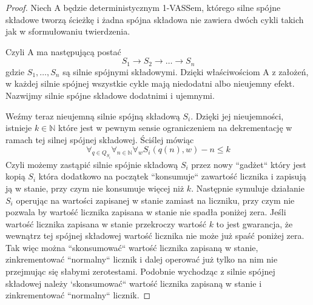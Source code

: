     \begin{proof}
        Niech A będzie deterministycznym 1-VASSem, którego silne spójne składowe tworzą ścieżkę i żadna spójna składowa
        nie zawiera dwóch cykli takich jak w sformułowaniu twierdzenia.

        Czyli A ma następującą postać
        \[S_1 \rightarrow S_2 \rightarrow \dots \rightarrow S_n     \]
        gdzie $S_1, \dots , S_n$ są silnie spójnymi składowymi.
        Dzięki właściwościom A z założeń, w każdej silnie spójnej wszystkie cykle mają niedodatni albo nieujemny efekt.
        Nazwijmy silnie spójne składowe dodatnimi i ujemnymi.

        Weźmy teraz nieujemną silnie spójną składową $S_i$.
        Dzięki jej nieujemności, istnieje $k \in \mathbb{N}$ które jest w pewnym sensie ograniczeniem na dekrementację w ramach tej silnej spójnej składowej.
        Ściślej mówiąc
        \[\forall_{q \in Q_{S_i}} \forall_{n \in \mathbb{N}} \forall_w S_i(q(n),w) -n \leq k\]
        Czyli możemy zastąpić silnie spójnie składową $S_i$ przez nowy ``gadżet`` który jest kopią $S_i$ która dodatkowo
        na początek ``konsumuje`` zawartość licznika i zapisują ją w stanie, przy czym nie konsumuje więcej niż $k$.
        Następnie symuluje działanie $S_i$ operując na wartości zapisanej w stanie zamiast na liczniku, przy czym nie pozwala
        by wartość licznika zapisana w stanie nie spadła poniżej zera.
        Jeśli wartość licznika zapisana w stanie przekroczy wartość $k$ to jest gwarancja, że wewnątrz tej spójnej składowej
        wartość licznika nie może już spaść poniżej zera.
        Tak więc można ``skonsumować`` wartość licznika zapisaną w stanie, zinkrementować ``normalny`` licznik i dalej operować już tylko na nim
        nie przejmując się słabymi zerotestami.
        Podobnie wychodząc z silnie spójnej składowej należy `skonsumować`` wartość licznika zapisaną w stanie i zinkrementować ``normalny`` licznik.



\end{proof}
